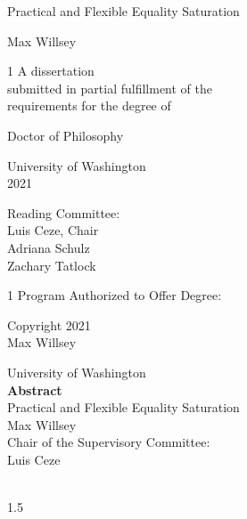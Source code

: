 \documentclass[12pt]{book}
\title{\mytitle}
\author{\myauthor}
\def\mytitle{Practical and Flexible Equality Saturation}
\def\myauthor{Max Willsey}
\def\year{2021}
\begin{document}
\pagestyle{empty}

\begin{center}
  {\huge \mytitle}
  \vfill

  {\Large \myauthor}
  \vfill

  \begin{spacing}{1}
    A dissertation \\
    submitted in partial fulfillment of the \\
    requirements for the degree of
  \end{spacing}
  \vfill

  Doctor of Philosophy
  \vfill

  University of Washington \\
  \year
  \vfill

  Reading Committee: \\
  Luis Ceze, Chair \\
  Adriana Schulz \\
  Zachary Tatlock
  \vfill

  \begin{spacing}{1}
    Program Authorized to Offer Degree: \\
    \cse
  \end{spacing}
  \clearpage

  \textcopyright{} Copyright \year\\
  \myauthor
  \clearpage
\end{center}

\pagestyle{plain}
\setcounter{page}{1}

\begin{center}
  University of Washington \\[1em]
  \textbf{Abstract}        \\[1em]
  \mytitle                 \\[1em]
  \myauthor                \\[1em]

  Chair of the Supervisory Committee: \\[-0.5em]
  Luis Ceze \\[-0.5em]
  \pgas
  \\[2em]
\end{center}


\begin{spacing}{1.5}
  \tableofcontents
\end{spacing}
\end{document}
